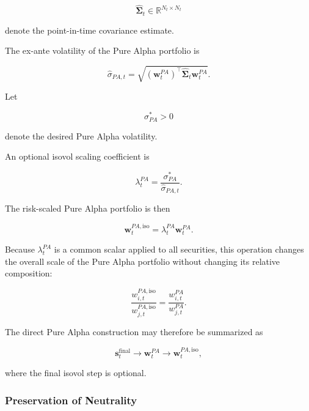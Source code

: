 \documentclass[11pt,a4paper]{article}
\begin{document}
\begin{equation}
\widehat{\boldsymbol{\Sigma}}_t
\in
\mathbb{R}^{N_t\times N_t}
\end{equation}

denote the point-in-time covariance estimate.

The ex-ante volatility of the Pure Alpha portfolio is

\begin{equation}
\boxed{
\widehat{\sigma}_{PA,t}
=
\sqrt{
\left(
\mathbf{w}_t^{PA}
\right)^{\top}
\widehat{\boldsymbol{\Sigma}}_t
\mathbf{w}_t^{PA}
}.
}
\end{equation}

Let

\begin{equation}
\sigma_{PA}^{*}>0
\end{equation}

denote the desired Pure Alpha volatility.

An optional isovol scaling coefficient is

\begin{equation}
\boxed{
\lambda_t^{PA}
=
\frac{
\sigma_{PA}^{*}
}{
\widehat{\sigma}_{PA,t}
}.
}
\end{equation}

The risk-scaled Pure Alpha portfolio is then

\begin{equation}
\boxed{
\mathbf{w}_t^{PA,\mathrm{iso}}
=
\lambda_t^{PA}
\mathbf{w}_t^{PA}.
}
\end{equation}

Because $\lambda_t^{PA}$ is a common scalar applied to all securities, this
operation changes the overall scale of the Pure Alpha portfolio without
changing its relative composition:

\begin{equation}
\frac{
w_{i,t}^{PA,\mathrm{iso}}
}{
w_{j,t}^{PA,\mathrm{iso}}
}
=
\frac{
w_{i,t}^{PA}
}{
w_{j,t}^{PA}
}.
\end{equation}

The direct Pure Alpha construction may therefore be summarized as

\begin{equation}
\boxed{
\mathbf{s}_t^{\mathrm{final}}
\rightarrow
\mathbf{w}_t^{PA}
\rightarrow
\mathbf{w}_t^{PA,\mathrm{iso}},
}
\end{equation}

where the final isovol step is optional.


\subsubsection{Preservation of Neutrality}
\end{document}
